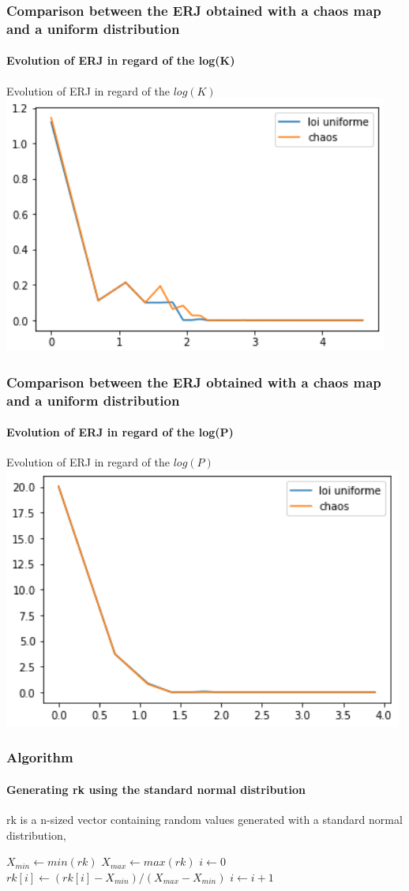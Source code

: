 \documentclass{beamer}
\begin{document}
\begin{frame}
	\frametitle{\color{velvet}Comparison between the ERJ obtained with a chaos map and a uniform distribution}
	\framesubtitle{Evolution of ERJ in regard of the log(K)}
	Evolution of ERJ in regard of the $log(K)$
	\includegraphics[scale=0.7]{uniforme/erreur_en_fct_de_logK.png}
\end{frame}
	
\begin{frame}
	\frametitle{\color{velvet}Comparison between the ERJ obtained with a chaos map and a uniform distribution}
	\framesubtitle{Evolution of ERJ in regard of the log(P)}
	Evolution of ERJ in regard of the $log(P)$
	\includegraphics[scale=0.7]{uniforme/erreur_en_fct_de_logP.png}
\end{frame}

\begin{frame}
	\frametitle{Algorithm}
	\framesubtitle{Generating rk using the standard normal distribution}
	rk is a n-sized vector containing random values generated with a standard normal distribution,
	\begin{algorithmic}
					\State $X_{min} \gets min(rk)$
					\State $X_{max} \gets max(rk)$
					\State $i \gets 0$
						\State $rk[i] \gets (rk[i]-X_{min})/(X_{max}-X_{min})$
						\State $i \gets i + 1$
					\EndWhile
				\end{algorithmic}
	
	\end{frame}
	
\end{document}

